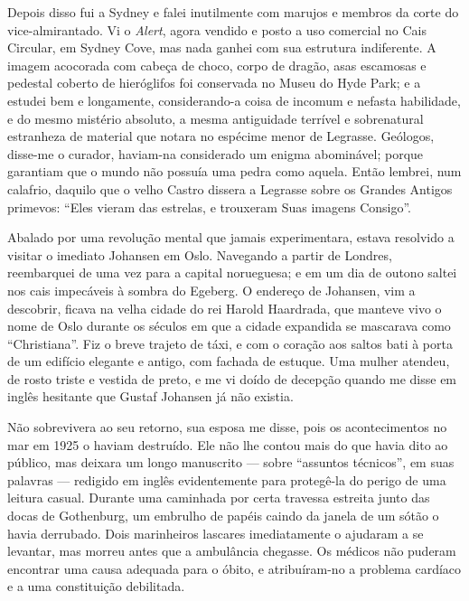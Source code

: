 Depois disso fui a Sydney e falei inutilmente com marujos e membros da
corte do vice-almirantado. Vi o \emph{Alert}, agora vendido e posto a
uso comercial no Cais Circular, em Sydney Cove, mas nada ganhei com sua
estrutura indiferente. A imagem acocorada com cabeça de choco, corpo de
dragão, asas escamosas e pedestal coberto de hieróglifos foi conservada
no Museu do Hyde Park; e a estudei bem e longamente, considerando-a
coisa de incomum e nefasta habilidade, e do mesmo mistério absoluto, a
mesma antiguidade terrível e sobrenatural estranheza de material que
notara no espécime menor de Legrasse. Geólogos, disse-me o curador,
haviam-na considerado um enigma abominável; porque garantiam que o mundo
não possuía uma pedra como aquela. Então lembrei, num calafrio, daquilo
que o velho Castro dissera a Legrasse sobre os Grandes Antigos primevos:
``Eles vieram das estrelas, e trouxeram Suas imagens Consigo''.

Abalado por uma revolução mental que jamais experimentara, estava
resolvido a visitar o imediato Johansen em Oslo. Navegando a partir de
Londres, reembarquei de uma vez para a capital norueguesa; e em um dia
de outono saltei nos cais impecáveis à sombra do Egeberg. O endereço de Johansen, vim a descobrir, ficava na velha
cidade do rei Harold Haardrada, que manteve vivo o nome de Oslo durante
os séculos em que a cidade expandida se mascarava como
``Christiana''. Fiz o breve trajeto de táxi, e com o coração aos
saltos bati à porta de um edifício elegante e antigo, com fachada de
estuque. Uma mulher atendeu, de rosto triste e vestida de preto, e me vi
doído de decepção quando me disse em inglês hesitante que Gustaf
Johansen já não existia.

Não sobrevivera ao seu retorno, sua esposa me disse, pois os
acontecimentos no mar em 1925 o haviam destruído. Ele não lhe contou
mais do que havia dito ao público, mas deixara um longo manuscrito ---
sobre ``assuntos técnicos'', em suas palavras --- redigido em inglês
evidentemente para protegê-la do perigo de uma leitura casual. Durante
uma caminhada por certa travessa estreita junto das docas de Gothenburg,
um embrulho de papéis caindo da janela de um sótão o havia derrubado.
Dois marinheiros lascares
imediatamente o ajudaram a se levantar, mas morreu antes que a
ambulância chegasse. Os médicos não puderam encontrar uma causa adequada
para o óbito, e atribuíram-no a problema cardíaco e a uma constituição
debilitada.

